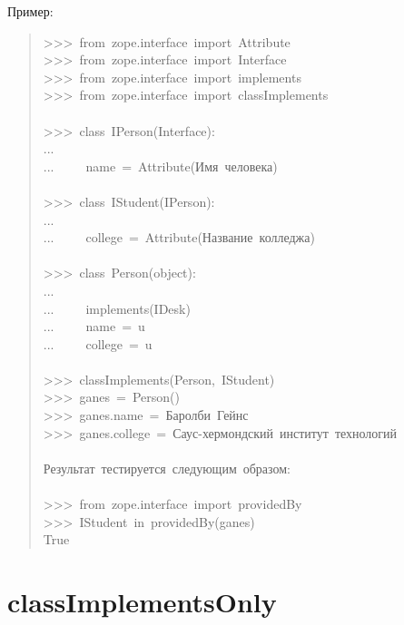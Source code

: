 \documentclass[a4paper,openany,twoside,final]{book}
\begin{document}
Пример:

\begin{quote}{\ttfamily \raggedright \noindent
>{}>{}>~from~zope.interface~import~Attribute\\
>{}>{}>~from~zope.interface~import~Interface\\
>{}>{}>~from~zope.interface~import~implements\\
>{}>{}>~from~zope.interface~import~classImplements\\
~\\
>{}>{}>~class~IPerson(Interface):\\
...\\
...~~~~~name~=~Attribute(\textquotedbl{}Имя~человека\textquotedbl{})\\
~\\
>{}>{}>~class~IStudent(IPerson):\\
...\\
...~~~~~college~=~Attribute(\textquotedbl{}Название~колледжа\textquotedbl{})\\
~\\
>{}>{}>~class~Person(object):\\
...\\
...~~~~~implements(IDesk)\\
...~~~~~name~=~u\textquotedbl{}\textquotedbl{}\\
...~~~~~college~=~u\textquotedbl{}\textquotedbl{}\\
~\\
>{}>{}>~classImplements(Person,~IStudent)\\
>{}>{}>~ganes~=~Person()\\
>{}>{}>~ganes.name~=~\textquotedbl{}Баролби~Гейнс\textquotedbl{}\\
>{}>{}>~ganes.college~=~\textquotedbl{}Саус-хермондский~институт~технологий\textquotedbl{}\\
~\\
Результат~тестируется~следующим~образом:\\
~\\
>{}>{}>~from~zope.interface~import~providedBy\\
>{}>{}>~IStudent~in~providedBy(ganes)\\
True
}
\end{quote}


\section*{classImplementsOnly%
  \label{classimplementsonly}%
}
\end{document}

